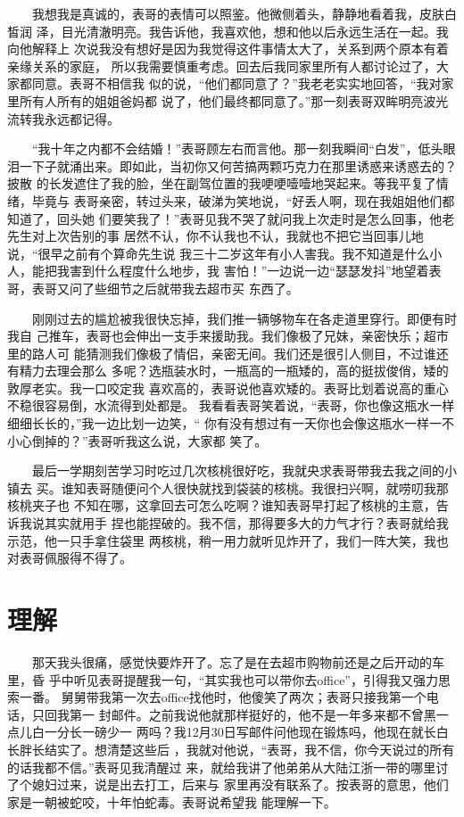 \documentclass[12pt]{book}
\begin{document}
　　我想我是真诚的，表哥的表情可以照鉴。他微侧着头，静静地看着我，皮肤白皙润
泽，目光清澈明亮。我告诉他，我喜欢他，想和他以后永远生活在一起。我向他解释上
次说我没有想好是因为我觉得这件事情太大了，关系到两个原本有着亲缘关系的家庭，
所以我需要慎重考虑。回去后我同家里所有人都讨论过了，大家都同意。表哥不相信我
似的说，“他们都同意了？”我老老实实地回答，“我对家里所有人所有的姐姐爸妈都
说了，他们最终都同意了。”那一刻表哥双眸明亮波光流转我永远都记得。

　　“我十年之内都不会结婚！”表哥顾左右而言他。那一刻我瞬间“白发”，低头眼
泪一下子就涌出来。即如此，当初你又何苦搞两颗巧克力在那里诱惑来诱惑去的？披散
的长发遮住了我的脸，坐在副驾位置的我哽哽噎噎地哭起来。等我平复了情绪，毕竟与
表哥亲密，转过头来，破涕为笑地说，“好丢人啊，现在我姐姐他们都知道了，回头她
们要笑我了！”表哥见我不哭了就问我上次走时是怎么回事，他老先生对上次告别的事
居然不认，你不认我也不认，我就也不把它当回事儿地说，“很早之前有个算命先生说
我三十二岁这年有小人害我。我不知道是什么小人，能把我害到什么程度什么地步，我
害怕！”一边说一边“瑟瑟发抖”地望着表哥，表哥又问了些细节之后就带我去超市买
东西了。

　　刚刚过去的尴尬被我很快忘掉，我们推一辆够物车在各走道里穿行。即便有时我自
己推车，表哥也会伸出一支手来援助我。我们像极了兄妹，亲密快乐；超市里的路人可
能猜测我们像极了情侣，亲密无间。我们还是很引人侧目，不过谁还有精力去理会那么
多呢？选瓶装水时，一瓶高的一瓶矮的，高的挺拔俊俏，矮的敦厚老实。我一口咬定我
喜欢高的，表哥说他喜欢矮的。表哥比划着说高的重心不稳很容易倒，水流得到处都是。
我看看表哥笑着说，“表哥，你也像这瓶水一样细细长长的，”我一边比划一边笑，“
你有没有想过有一天你也会像这瓶水一样一不小心倒掉的？”表哥听我这么说，大家都
笑了。

　　最后一学期刻苦学习时吃过几次核桃很好吃，我就央求表哥带我去我之间的小镇去
买。谁知表哥随便问个人很快就找到袋装的核桃。我很扫兴啊，就唠叨我那核桃夹子也
不知在哪，这拿回去可怎么吃啊？谁知表哥早打起了核桃的主意，告诉我说其实就用手
捏也能捏破的。我不信，那得要多大的力气才行？表哥就给我示范，他一只手拿住袋里
两核桃，稍一用力就听见炸开了，我们一阵大笑，我也对表哥佩服得不得了。
\section{理解}
\label{sec-8-6}

　　那天我头很痛，感觉快要炸开了。忘了是在去超市购物前还是之后开动的车里，昏
乎中听见表哥提醒我一句，“其实我也可以带你去office”，引得我又强力思索一番。
舅舅带我第一次去office找他时，他傻笑了两次；表哥只接我第一个电话，只回我第一
封邮件。之前我说他就那样挺好的，他不是一年多来都不曾黑一点儿白一分长一磅少一
两吗？我12月30日写邮件问他现在锻炼吗，他现在就长白长胖长结实了。想清楚这些后
，我就对他说，“表哥，我不信，你今天说过的所有的话我都不信。”表哥见我清醒过
来，就给我讲了他弟弟从大陆江浙一带的哪里讨了个媳妇过来，说是出去打工，后来与
家里再没有联系了。按表哥的意思，他们家是一朝被蛇咬，十年怕蛇毒。表哥说希望我
能理解一下。
\end{document}
